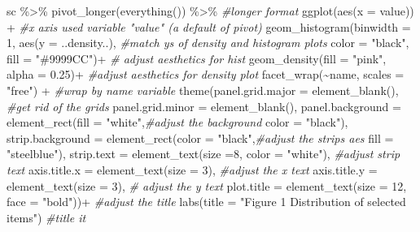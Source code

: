 \documentclass[
]{article}
\newenvironment{Shaded}{\begin{snugshade}}{\end{snugshade}}
\newcommand{\AttributeTok}[1]{\textcolor[rgb]{0.77,0.63,0.00}{#1}}
\newcommand{\CommentTok}[1]{\textcolor[rgb]{0.56,0.35,0.01}{\textit{#1}}}
\newcommand{\DecValTok}[1]{\textcolor[rgb]{0.00,0.00,0.81}{#1}}
\newcommand{\FloatTok}[1]{\textcolor[rgb]{0.00,0.00,0.81}{#1}}
\newcommand{\FunctionTok}[1]{\textcolor[rgb]{0.00,0.00,0.00}{#1}}
\newcommand{\NormalTok}[1]{#1}
\newcommand{\SpecialCharTok}[1]{\textcolor[rgb]{0.00,0.00,0.00}{#1}}
\newcommand{\StringTok}[1]{\textcolor[rgb]{0.31,0.60,0.02}{#1}}
\begin{document}
\begin{Shaded}
\begin{Highlighting}[]
\NormalTok{sc }\SpecialCharTok{\%\textgreater{}\%} 
  \FunctionTok{pivot\_longer}\NormalTok{(}\FunctionTok{everything}\NormalTok{()) }\SpecialCharTok{\%\textgreater{}\%}  \CommentTok{\#longer format}
  \FunctionTok{ggplot}\NormalTok{(}\FunctionTok{aes}\NormalTok{(}\AttributeTok{x =}\NormalTok{ value)) }\SpecialCharTok{+} \CommentTok{\#x axis used variable "value" (a default of pivot)}
  \FunctionTok{geom\_histogram}\NormalTok{(}\AttributeTok{binwidth =} \DecValTok{1}\NormalTok{, }\FunctionTok{aes}\NormalTok{(}\AttributeTok{y =}\NormalTok{ ..density..), }\CommentTok{\#match ys of density and histogram plots}
                 \AttributeTok{color =} \StringTok{"black"}\NormalTok{,  }\AttributeTok{fill =} \StringTok{"\#9999CC"}\NormalTok{)}\SpecialCharTok{+}  \CommentTok{\# adjust aesthetics for hist}
  \FunctionTok{geom\_density}\NormalTok{(}\AttributeTok{fill =} \StringTok{"pink"}\NormalTok{, }\AttributeTok{alpha =} \FloatTok{0.25}\NormalTok{)}\SpecialCharTok{+} \CommentTok{\#adjust aesthetics for density plot}
  \FunctionTok{facet\_wrap}\NormalTok{(}\SpecialCharTok{\textasciitilde{}}\NormalTok{name, }\AttributeTok{scales =} \StringTok{"free"}\NormalTok{) }\SpecialCharTok{+} \CommentTok{\#wrap by name variable}
  \FunctionTok{theme}\NormalTok{(}\AttributeTok{panel.grid.major =} \FunctionTok{element\_blank}\NormalTok{(), }\CommentTok{\#get rid of the  grids}
        \AttributeTok{panel.grid.minor =} \FunctionTok{element\_blank}\NormalTok{(),}
        \AttributeTok{panel.background =} \FunctionTok{element\_rect}\NormalTok{(}\AttributeTok{fill =} \StringTok{"white"}\NormalTok{,}\CommentTok{\#adjust the background}
                                        \AttributeTok{color =} \StringTok{"black"}\NormalTok{),}
        \AttributeTok{strip.background =} \FunctionTok{element\_rect}\NormalTok{(}\AttributeTok{color =} \StringTok{"black"}\NormalTok{,}\CommentTok{\#adjust the strips aes}
                                        \AttributeTok{fill =} \StringTok{"steelblue"}\NormalTok{),}
        \AttributeTok{strip.text =} \FunctionTok{element\_text}\NormalTok{(}\AttributeTok{size =}\DecValTok{8}\NormalTok{, }\AttributeTok{color =} \StringTok{"white"}\NormalTok{), }\CommentTok{\#adjust strip text}
        \AttributeTok{axis.title.x =} \FunctionTok{element\_text}\NormalTok{(}\AttributeTok{size =} \DecValTok{3}\NormalTok{), }\CommentTok{\#adjust the x text}
        \AttributeTok{axis.title.y =} \FunctionTok{element\_text}\NormalTok{(}\AttributeTok{size =} \DecValTok{3}\NormalTok{), }\CommentTok{\# adjust the y text}
        \AttributeTok{plot.title =} \FunctionTok{element\_text}\NormalTok{(}\AttributeTok{size =} \DecValTok{12}\NormalTok{, }\AttributeTok{face =} \StringTok{"bold"}\NormalTok{))}\SpecialCharTok{+} \CommentTok{\#adjust the title}
  \FunctionTok{labs}\NormalTok{(}\AttributeTok{title =} \StringTok{"Figure 1 Distribution of selected items"}\NormalTok{) }\CommentTok{\#title it}
\end{Highlighting}
\end{Shaded}
\end{document}
